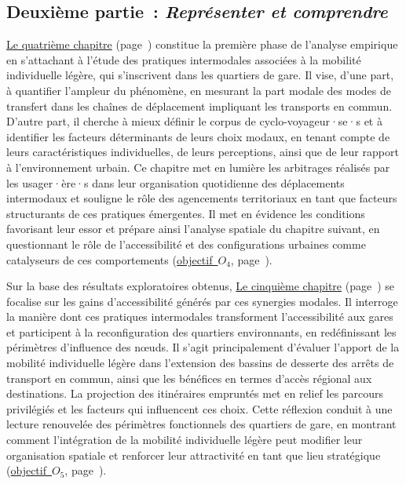\begin{refsegment}
\subsection*{Deuxième partie~: \textsl{Représenter et comprendre}
    \label{introduction-generale:annonce-plan-2}
    }

\hyperref[chap4:titre]{Le quatrième chapitre} (page~\pageref{chap4:titre}) constitue la première phase de l’analyse empirique en s’attachant à l’étude des pratiques intermodales associées à la mobilité individuelle légère, qui s'inscrivent dans les quartiers de gare. Il vise, d’une part, à quantifier l’ampleur du phénomène, en mesurant la part modale des modes de transfert dans les chaînes de déplacement impliquant les transports en commun. D’autre part, il cherche à mieux définir le corpus de cyclo-voyageur·se·s et à identifier les facteurs déterminants de leurs choix modaux, en tenant compte de leurs caractéristiques individuelles, de leurs perceptions, ainsi que de leur rapport à l’environnement urbain. Ce chapitre met en lumière les arbitrages réalisés par les usager·ère·s dans leur organisation quotidienne des déplacements intermodaux et souligne le rôle des agencements territoriaux en tant que facteurs structurants de ces pratiques émergentes. Il met en évidence les conditions favorisant leur essor et prépare ainsi l’analyse spatiale du chapitre suivant, en questionnant le rôle de l’accessibilité et des configurations urbaines comme catalyseurs de ces comportements (\hyperref[objectif-4]{objectif~\(O_4\)}, page~\pageref{objectif-4}).%

Sur la base des résultats exploratoires obtenus, \hyperref[chap5:titre]{Le cinquième chapitre} (page~\pageref{chap5:titre}) se focalise sur les gains d'accessibilité générés par ces synergies modales. Il interroge la manière dont ces pratiques intermodales transforment l’accessibilité aux gares et participent à la reconfiguration des quartiers environnants, en redéfinissant les périmètres d’influence des nœuds. Il s'agit principalement d'évaluer l'apport de la mobilité individuelle légère dans l'extension des bassins de desserte des arrêts de transport en commun, ainsi que les bénéfices en termes d'accès régional aux destinations. La projection des itinéraires empruntés met en relief les parcours privilégiés et les facteurs qui influencent ces choix. Cette réflexion conduit à une lecture renouvelée des périmètres fonctionnels des quartiers de gare, en montrant comment l’intégration de la mobilité individuelle légère peut modifier leur organisation spatiale et renforcer leur attractivité en tant que lieu stratégique (\hyperref[objectif-5]{objectif~\(O_5\)}, page~\pageref{objectif-5}).%


\end{refsegment}
